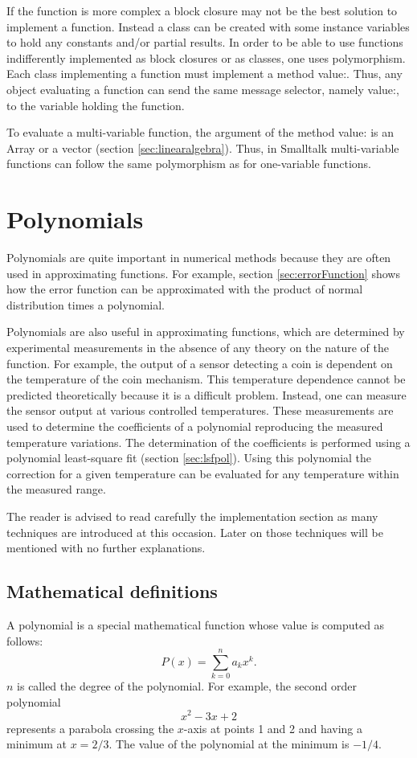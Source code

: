 \documentclass[twoside]{book}
\begin{document}
If the function is more complex a block closure may not be the
best solution to implement a function. Instead a class can be
created with some instance variables to hold any constants and/or
partial results. In order to be able to use functions
indifferently implemented as block closures or as classes, one
uses polymorphism. Each class implementing a function must
implement a method value:. Thus, any object evaluating a function
can send the same message selector, namely value:, to the variable
holding the function.

To evaluate a multi-variable function, the argument of the method
value: is an Array or a vector (\cf section
\ref{sec:linearalgebra}). Thus, in Smalltalk multi-variable
functions can follow the same polymorphism as for one-variable
functions.

\section{Polynomials}
\label{sec:polynomial}
 Polynomials are quite important in
numerical methods because they are often used in approximating
functions. For example, section \ref{sec:errorFunction} shows how
the error function can be approximated with the product of normal
distribution times a polynomial.

Polynomials are also useful in approximating functions, which are
determined by experimental measurements in the absence of any
theory on the nature of the function. For example, the output of a
sensor detecting a coin is dependent on the temperature of the
coin mechanism. This temperature dependence cannot be predicted
theoretically because it is a difficult problem. Instead, one can
measure the sensor output at various controlled temperatures.
These measurements are used to determine the coefficients of a
polynomial reproducing the measured temperature variations. The
determination of the coefficients is performed using a polynomial
least-square fit (\cf section \ref{sec:lsfpol}). Using this
polynomial the correction for a given temperature can be evaluated
for any temperature within the measured range.

The reader is advised to read carefully the implementation section as many techniques are introduced at this occasion.
Later on those techniques will be mentioned with no further explanations.

\subsection{Mathematical definitions}
\label{sec:polymath} A polynomial is a special mathematical
function whose value is computed as follows:
\begin{equation}
\label{eq:polynomialDef}P\left(x\right)=\sum_{k=0}^{n}a_k x^k.
\end{equation}
$n$ is called the degree of the polynomial. For example, the
second order polynomial
\begin{equation}
\label{eq:polynomialExample} x^2 -3x + 2
\end{equation}
represents a parabola crossing the $x$-axis at points 1 and 2 and
having a minimum at $x= 2/3$. The value of the polynomial at the
minimum is $-1/4$.
\end{document}
